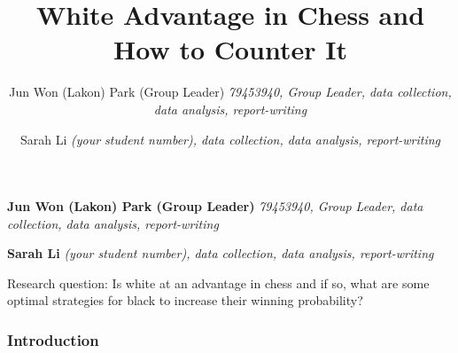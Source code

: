 \documentclass[11pt,]{article}
\title{White Advantage in Chess and How to Counter It  }
\author{\Large Jun Won (Lakon) Park (Group Leader)\vspace{0.05in} \newline\normalsize\emph{79453940, Group Leader, data collection, data analysis, report-writing}   \and \Large Sarah Li\vspace{0.05in} \newline\normalsize\emph{(your student number), data collection, data analysis, report-writing}  }
\date{}
\newcommand*{\authorfont}{\fontfamily{phv}\selectfont}
\renewenvironment{abstract}
 {{%
    \setlength{\leftmargin}{0mm}
    \setlength{\rightmargin}{\leftmargin}%
  }%
  \relax}
 {\endlist}
\begin{document}
	
%

{%
\setlength{\parindent}{0pt}
\thispagestyle{plain}
{\fontsize{18}{20}\selectfont\raggedright 
\maketitle  %

}

{
   \vskip 13.5pt\relax \normalsize\fontsize{11}{12} 
\textbf{\authorfont Jun Won (Lakon) Park (Group Leader)} \hskip 15pt \emph{\small 79453940, Group Leader, data collection, data analysis, report-writing}   \par \textbf{\authorfont Sarah Li} \hskip 15pt \emph{\small (your student number), data collection, data analysis, report-writing}   

}

}








\begin{abstract}

    \hbox{\vrule height .2pt width 39.14pc}

    \vskip 8.5pt %

\noindent Research question: Is white at an advantage in chess and if so, what are
some optimal strategies for black to increase their winning probability?


    \hbox{\vrule height .2pt width 39.14pc}


\end{abstract}


\vskip -8.5pt



\noindent  

\hypertarget{introduction}{%
\subsubsection{Introduction}\label{introduction}}
\end{document}
